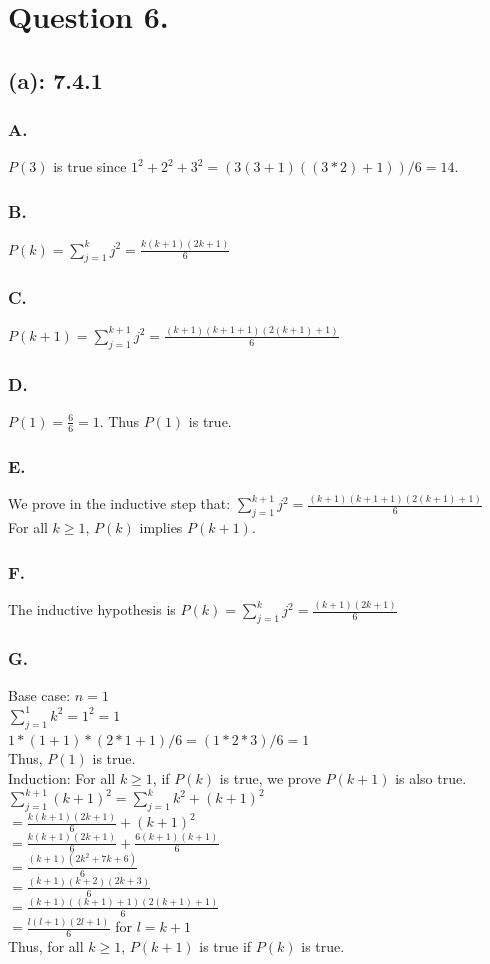 \documentclass[titlepage]{article}\pagestyle{empty}
\begin{document}
\section*{Question 6.}
\subsection*{(a): 7.4.1}
\subsubsection*{A.} 
$P(3)$ is true since $1^2 + 2^2+3^2 = (3(3+1)((3 * 2) + 1))/6 = 14$.
\subsubsection*{B.}
$P(k)=\sum_{j=1}^{k}j^2=\frac{k(k+1)(2k+1)}{6}$
\subsubsection*{C.}
$P(k+1)=\sum_{j=1}^{k+1}j^2=\frac{(k+1)(k+1+1)(2(k+1)+1)}{6}$
\subsubsection*{D.}
$P(1) = \frac{6}{6} = 1$. Thus $P(1)$ is true.
\subsubsection*{E.}
We prove in the inductive step that: $\sum_{j=1}^{k+1}j^2=\frac{(k+1)(k+1+1)(2(k+1)+1)}{6}$\\
For all $k \geq 1$, $P(k)$ implies $P(k+1)$.
\subsubsection*{F.}
The inductive hypothesis is $P(k)=\sum_{j=1}^{k}j^2=\frac{(k+1)(2k+1)}{6}$
\subsubsection*{G.}
Base case: $n=1$\\
$\sum_{j=1}^{1}k^2=1^2=1$\\
$1*(1+1)*(2*1+1)/6=(1*2*3)/6=1$\\
Thus, $P(1)$ is true.\\
Induction: For all $k \geq 1$, if $P(k)$ is true, we prove $P(k+1)$ is also true.\\
$\sum_{j=1}^{k+1}(k+1)^2=\sum_{j=1}^{k}k^2+(k+1)^2$\\
$=\frac{k(k+1)(2k+1)}{6}+(k+1)^2$\\
$=\frac{k(k+1)(2k+1)}{6}+\frac{6(k+1)(k+1)}{6}$\\
$=\frac{(k+1)(2k^2+7k+6)}{6}$\\
$=\frac{(k+1)(k+2)(2k+3)}{6}$\\
$=\frac{(k+1)((k+1)+1)(2(k+1)+1)}{6}$\\
$=\frac{l(l+1)(2l+1)}{6}$ for $l=k+1$\\
Thus, for all $k\geq1$, $P(k+1)$ is true if $P(k)$ is true.\\
\pagebreak
\end{document}
